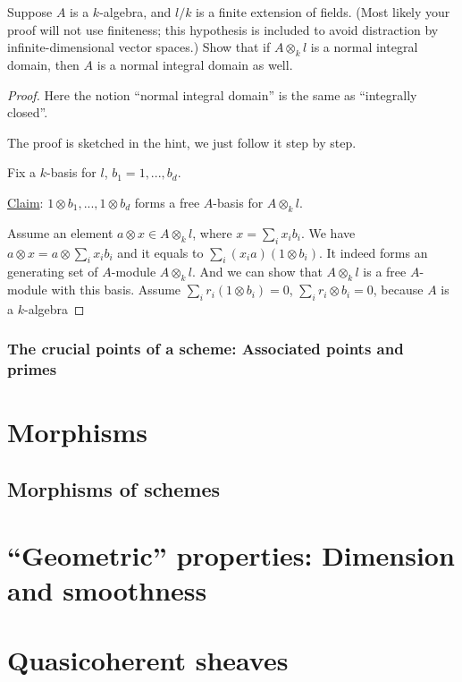 \documentclass[11pt]{book} %
\begin{document}
\begin{exr}
Suppose $A$ is a $k$-algebra, and $l/k$ is a finite extension of fields. (Most likely your proof will not use finiteness; this hypothesis is included to avoid distraction by infinite-dimensional vector spaces.) Show that if $A\otimes_k l$ is a normal integral domain, then $A$ is a normal integral domain as well.
\end{exr}
\begin{proof}
Here the notion ``normal integral domain'' is the same as ``integrally closed''.

The proof is sketched in the hint, we just follow it step by step.

 Fix a $k$-basis for $l$, $b_1=1,...,b_d$.

 \underline{Claim}: $1\otimes b_1,...,1\otimes b_d$ forms a free $A$-basis for $A\otimes_k l$. 

 Assume an element $a\otimes x\in A\otimes_k l$, where $x=\sum_i x_i b_i$. We have 
 $a\otimes x=a\otimes \sum_i x_i b_i$ and it equals to $\sum_i (x_i a) (1\otimes b_i)$. It indeed forms an generating set of  $A$-module $A\otimes_k l$. And we can show that $A\otimes_k l$ is a free $A$-module with this basis. Assume $\sum_i r_i(1\otimes b_i)=0$, $\sum_i r_i\otimes b_i=0$, because $A$ is a $k$-algebra

\end{proof}
\section{The crucial points of a scheme: Associated points and primes}

\part{Morphisms}
\chapter{Morphisms of schemes}
\part{``Geometric'' properties: Dimension and smoothness}

\part{Quasicoherent sheaves}
\end{document}
